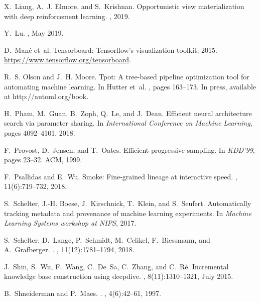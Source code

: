 \documentclass[11pt,dvipdfmx]{article}
\begin{document}
{\begin{thebibliography}{10}
X.~Liang, A.~J. Elmore, and S.~Krishnan.
\newblock Opportunistic view materialization with deep reinforcement learning.
, 2019.

Y.~Lu.
, May
  2019.

D.~Man{\'e} et~al.
\newblock Tensorboard: Tensorflow’s visualization toolkit, 2015.
\newblock \url{https://www.tensorflow.org/tensorboard}.

R.~S. Olson and J.~H. Moore.
\newblock Tpot: A tree-based pipeline optimization tool for automating machine
  learning.
\newblock In Hutter et~al. \cite{automl}, pages 163--173.
\newblock In press, available at http://automl.org/book.

H.~Pham, M.~Guan, B.~Zoph, Q.~Le, and J.~Dean.
\newblock Efficient neural architecture search via parameter sharing.
\newblock In {\em International Conference on Machine Learning}, pages
  4092--4101, 2018.

F.~Provost, D.~Jensen, and T.~Oates.
\newblock Efficient progressive sampling.
\newblock In {\em KDD'99}, pages 23--32. ACM, 1999.

F.~Psallidas and E.~Wu.
\newblock Smoke: Fine-grained lineage at interactive speed.
, 11(6):719--732, 2018.

S.~Schelter, J.-H. Boese, J.~Kirschnick, T.~Klein, and S.~Seufert.
\newblock Automatically tracking metadata and provenance of machine learning
  experiments.
\newblock In {\em Machine Learning Systems workshop at NIPS}, 2017.

S.~Schelter, D.~Lange, P.~Schmidt, M.~Celikel, F.~Biessmann, and A.~Grafberger.
.
, 11(12):1781--1794, 2018.

J.~Shin, S.~Wu, F.~Wang, C.~De~Sa, C.~Zhang, and C.~R{\'e}.
\newblock Incremental knowledge base construction using deepdive.
, 8(11):1310--1321, July 2015.

B.~Shneiderman and P.~Maes.
.
, 4(6):42--61, 1997.


\end{thebibliography}}
\end{document}
